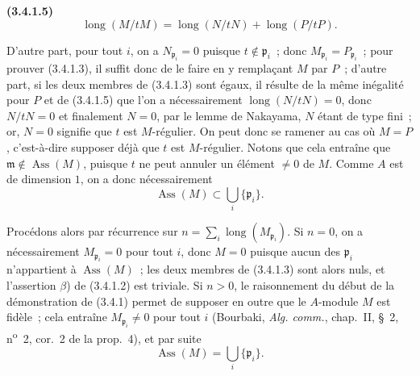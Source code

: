 \documentclass[10pt,oneside]{book}
\newcommand{\oldpage}[2][]{%
  \setcounter{footnote}{0}%
  \marginpar{\scriptsize\textbf{#1}~|~#2}\ignorespaces}
\newenvironment{env}[1][]{\par\medskip\noindent\textbf{(#1)}\ }{\par}
\begin{document}
\begin{env}[3.4.1.5]
\label{IV.2.3.4.1.5-fr}
\[
\operatorname{long}(M/tM)
=\operatorname{long}(N/tN)+\operatorname{long}(P/tP).
\]
\end{env}

D'autre part, pour tout $i$, on a $N_{\mathfrak p_i}=0$ puisque
$t\notin\mathfrak p_i$~; donc $M_{\mathfrak p_i}=P_{\mathfrak p_i}$~; pour
prouver (3.4.1.3), il suffit donc de le faire en y remplaçant $M$ par $P$~;
d'autre part, si les deux membres de (3.4.1.3) sont égaux, il résulte de la
même inégalité pour $P$ et de (3.4.1.5) que l'on a nécessairement
$\operatorname{long}(N/tN)=0$, donc $N/tN=0$ et finalement $N=0$, par le lemme
de Nakayama, $N$ étant de type fini~; or, $N=0$ signifie que $t$ est
$M$-régulier. On peut donc se ramener au cas où $M=P$, c'est-à-dire supposer
déjà que $t$ est $M$-régulier. Notons que cela entraîne que
$\mathfrak m\notin\operatorname{Ass}(M)$, puisque $t$ ne peut annuler un
élément $\neq0$ de $M$. Comme $A$ est de dimension $1$, on a donc
nécessairement
\[
\operatorname{Ass}(M)\subset\bigcup_i\{\mathfrak p_i\}.
\]

Procédons alors par récurrence sur
$n=\sum_i\operatorname{long}(M_{\mathfrak p_i})$. Si $n=0$, on a
nécessairement $M_{\mathfrak p_i}=0$ pour tout $i$, donc $M=0$ puisque aucun
des $\mathfrak p_i$ n'appartient à $\operatorname{Ass}(M)$~; les deux membres
de (3.4.1.3) sont alors nuls, et l'assertion $\beta$) de (3.4.1.2) est
triviale. Si $n>0$, le raisonnement du début de la démonstration de (3.4.1)
permet de supposer en outre que le $A$-module $M$ est fidèle~; cela entraîne
$M_{\mathfrak p_i}\neq0$ pour tout $i$ (Bourbaki, \emph{Alg. comm.}, chap.~II,
\S~2, n\textsuperscript{o}~2, cor.~2 de la prop.~4), et par suite
\[
\operatorname{Ass}(M)=\bigcup_i\{\mathfrak p_i\}.
\]

\oldpage[IV-2]{48}
\end{document}
